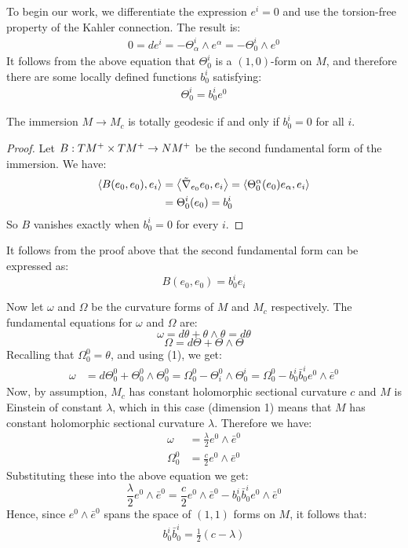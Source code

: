 To begin our work, we differentiate the expression $e^i = 0$ and use the torsion-free property of the Kahler connection.  The result is:
%
\begin{align*}
0 = d e^i = - \Theta^i_{\alpha} \wedge e^{\alpha} = - \Theta^i_0 \wedge e^0
\end{align*}
%
It follows from the above equation that $\Theta^i_0$ is a $(1,0)$-form on $M$, and therefore there are some locally defined functions $b^i_0$ satisfying:
%
\begin{align}
\Theta^i_0 = b^i_0 e^0
\end{align}

\begin{lem} The immersion $M \rightarrow M_c$ is totally geodesic if and only if $b^i_0 = 0$ for all $i$.
\end{lem}

\begin{proof} Let $B : TM^{+} \times TM^{+} \rightarrow NM^+$ be the second fundamental form of the immersion.  We have:
%
\begin{align*}
\left\langle B(e_0, e_0), e_i \right\rangle &= \left\langle \tilde{\nabla}_{e_0} e_0, e_i \right\rangle = \left\langle \Theta^{\alpha}_0 ( e_0 ) e_{\alpha}, e_i \right\rangle \\
&= \Theta^i_0 (e_0) = b^i_0
\end{align*}
%
So $B$ vanishes exactly when $b^i_0 = 0$ for every $i$.
%
\end{proof}

It follows from the proof above that the second fundamental form can be expressed as:
%
$$B(e_0, e_0) = b^i_0 e_i$$

Now let $\omega$ and $\Omega$ be the curvature forms of $M$ and $M_c$ respectively.  The fundamental equations for $\omega$ and $\Omega$ are:
%
$$\omega =  d\theta + \theta \wedge \theta = d\theta$$
%
$$\Omega = d\Theta + \Theta \wedge \Theta$$
%
Recalling that $\Omega^0_0 = \theta$, and using (1), we get:
%
\begin{align*}
\omega &= d\Theta^0_0 + \Theta^0_0 \wedge \Theta^0_0 = \Omega^0_0 - \Theta^0_i \wedge \Theta^i_0 = \Omega^0_0 - b^i_0 \bar{b}^i_0 e^0 \wedge \bar{e}^0
\end{align*}
%
Now, by assumption, $M_c$ has constant holomorphic sectional curvature $c$ and $M$ is Einstein of constant $\lambda$, which in this case (dimension 1) means that $M$ has constant holomorphic sectional curvature $\lambda$.  Therefore we have:
%
\begin{align*}
\omega &= \frac{\lambda}{2}e^0 \wedge \bar{e}^0 \\
\Omega^0_0 &= \frac{c}{2} e^0 \wedge \bar{e}^0
\end{align*}
%
Substituting these into the above equation we get:
%
$$\frac{\lambda}{2}e^0 \wedge \bar{e}^0 = \frac{c}{2} e^0 \wedge \bar{e}^0- b^i_0 \bar{b}^i_0 e^0 \wedge \bar{e}^0$$
%
Hence, since $e^0 \wedge \bar{e}^0$ spans the space of $(1,1)$ forms on $M$,  it follows that:
%
\begin{align}
b^i_0 \bar{b}^i_0 = \frac{1}{2}(c - \lambda)
\end{align}

